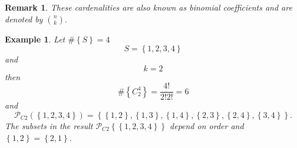 \documentclass[aps,preprint]{revtex4}%
\newtheorem{example}[theorem]{Example}
\newtheorem{remark}[theorem]{Remark}
\begin{document}
\begin{remark}
These cardenalities are also known as \emph{binomial coefficients} and are
denoted by $\binom{n}{k}.$
\end{remark}

\begin{example}
Let $\#\left\{  S\right\}  =4$
\begin{equation}
S=\left\{  1,2,3,4\right\}
\end{equation}
and
\begin{equation}
k=2
\end{equation}
then
\begin{equation}
\#\left\{  C_{2}^{4}\right\}  =\frac{4!}{2!2!}=6
\end{equation}
and
\begin{equation}
\mathcal{P}_{C2}\left(  \left\{  1,2,3,4\right\}  \right)  =\left\{  \left\{
1,2\right\}  ,\left\{  1,3\right\}  ,\left\{  1,4\right\}  ,\left\{
2,3\right\}  ,\left\{  2,4\right\}  ,\left\{  3,4\right\}  \right\}  .
\end{equation}
The subsets in the result $\mathcal{P}_{C2}\left\{  \left\{  1,2,3,4\right\}
\right\}  $ \emph{depend on order} and $\left\{  1,2\right\}  =\left\{
2,1\right\}  .$
\end{example}
\end{document}
